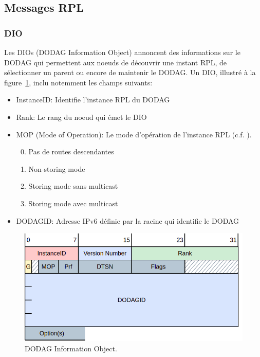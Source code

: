\subsection*{Messages RPL}

\subsubsection*{DIO}
    Les DIOs (DODAG Information Object) annoncent des informations sur le DODAG qui permettent aux noeuds de découvrir une instant RPL, de sélectionner un parent ou encore de maintenir le DODAG.
    Un DIO, illustré à la figure~\ref{fig:state-dio}, inclu notemment les champs suivants:
    \begin{itemize}
        \item InstanceID: Identifie l'instance RPL du DODAG
        \item Rank: Le rang du noeud qui émet le DIO
        \item MOP (Mode of Operation): Le mode d'opération de l'instance RPL (c.f. ).
        \begin{enumerate}
            \setcounter{enumi}{-1}
            \item Pas de routes descendantes
            \item Non-storing mode
            \item Storing mode sans multicast
            \item Storing mode avec multicast
        \end{enumerate}
        \item DODAGID: Adresse IPv6 définie par la racine qui identifie le DODAG
    \end{itemize}
    \begin{figure}[H]
        \centering
        \includegraphics[scale=0.5]{res/pictures/dio.drawio.png}
        \caption{DODAG Information Object.}
        \label{fig:state-dio}
    \end{figure}

